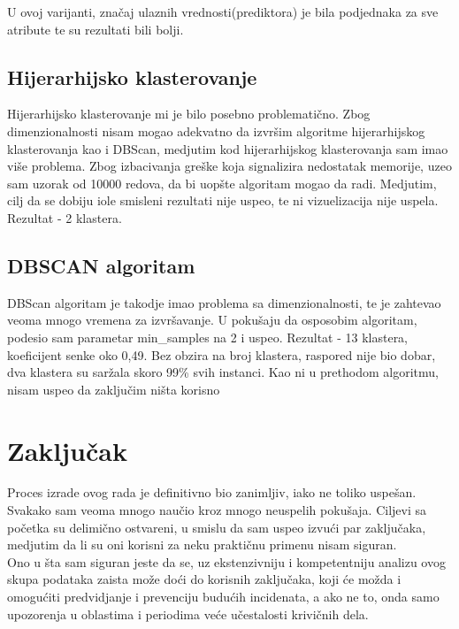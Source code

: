 \documentclass[
	12pt,			
	openright,		
	oneside,			
	a4paper,		
	english,			
	]{article}
\begin{document}
U ovoj varijanti, značaj ulaznih vrednosti(prediktora) je bila podjednaka za sve atribute te su rezultati bili bolji.
        
\subsection{Hijerarhijsko klasterovanje}
Hijerarhijsko klasterovanje mi je bilo posebno problematično. 
Zbog dimenzionalnosti nisam mogao adekvatno da izvršim algoritme hijerarhijskog klasterovanja kao i DBScan, medjutim kod hijerarhijskog klasterovanja sam imao više problema.
Zbog izbacivanja greške koja signalizira nedostatak memorije, uzeo sam uzorak od 10000 redova, da bi uopšte algoritam mogao da radi. Medjutim, cilj da se dobiju iole smisleni rezultati nije uspeo, te ni vizuelizacija nije uspela.
Rezultat - 2 klastera.

\subsection{DBSCAN algoritam}
DBScan algoritam je takodje imao problema sa dimenzionalnosti, te je zahtevao veoma mnogo vremena za izvršavanje.
U pokušaju da osposobim algoritam, podesio sam parametar min\_samples na 2 i uspeo. Rezultat - 13 klastera, koeficijent senke oko 0,49.
Bez obzira na broj klastera, raspored nije bio dobar, dva klastera su saržala skoro 99\% svih instanci.
Kao ni u prethodom algoritmu, nisam uspeo da zaključim ništa korisno 




\section{Zaključak}
Proces izrade ovog rada je definitivno bio zanimljiv, iako ne toliko uspešan. Svakako sam veoma mnogo naučio kroz mnogo neuspelih pokušaja.
Ciljevi sa početka su delimično ostvareni, u smislu da sam uspeo izvući par zaključaka, medjutim da li su oni korisni za neku praktičnu primenu nisam siguran. 
\\
Ono u šta sam siguran jeste da se, uz ekstenzivniju i kompetentniju analizu ovog skupa podataka zaista može doći do korisnih zaključaka, koji će možda i omogućiti predvidjanje i prevenciju budućih incidenata, a ako ne to, onda samo upozorenja u oblastima i periodima veće učestalosti krivičnih dela.


        
        
\end{document}
